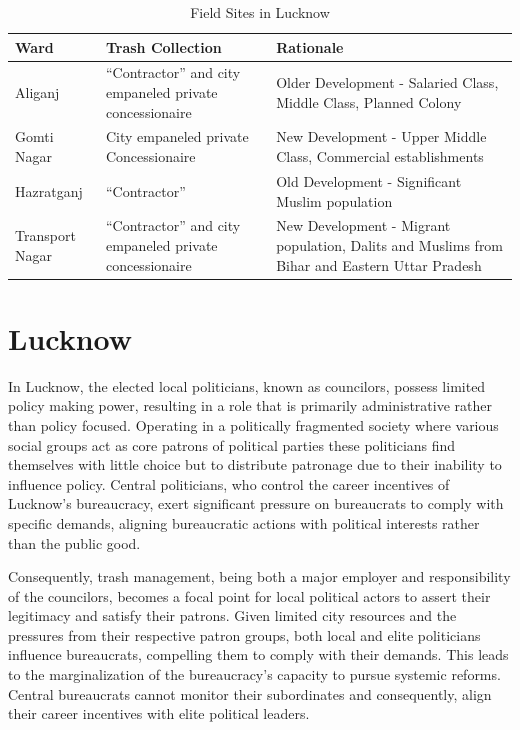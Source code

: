 \begin{table}[ht]
\centering
\caption{Field Sites in Lucknow}
\label{tab:field_sites_lucknow}
\begin{tabular}{|p{2.5cm}|p{5cm}|p{6cm}|}
\hline
\textbf{Ward} & \textbf{Trash Collection} & \textbf{Rationale} \\
\hline
Aliganj & ``Contractor'' and city empaneled private concessionaire & Older Development - Salaried Class, Middle Class, Planned Colony \\
\hline
Gomti Nagar & City empaneled private Concessionaire & New Development - Upper Middle Class, Commercial establishments \\
\hline
Hazratganj & ``Contractor'' & Old Development - Significant Muslim population \\
\hline
Transport Nagar & ``Contractor'' and city empaneled private concessionaire & New Development - Migrant population, Dalits and Muslims from Bihar and Eastern Uttar Pradesh \\
\hline
\end{tabular}
\end{table}

\section{Lucknow}

In Lucknow, the elected local politicians, known as councilors, possess limited policy making power, resulting in a role that is primarily administrative rather than policy focused. Operating in a politically fragmented society where various social groups act as core patrons of political parties these politicians find themselves with little choice but to distribute patronage due to their inability to influence policy. Central politicians, who control the career incentives of Lucknow's bureaucracy, exert significant pressure on bureaucrats to comply with specific demands, aligning bureaucratic actions with political interests rather than the public good.

Consequently, trash management, being both a major employer and responsibility of the councilors, becomes a focal point for local political actors to assert their legitimacy and satisfy their patrons. Given limited city resources and the pressures from their respective patron groups, both local and elite politicians influence bureaucrats, compelling them to comply with their demands. This leads to the marginalization of the bureaucracy's capacity to pursue systemic reforms. Central bureaucrats cannot monitor their subordinates and consequently, align their career incentives with elite political leaders.

